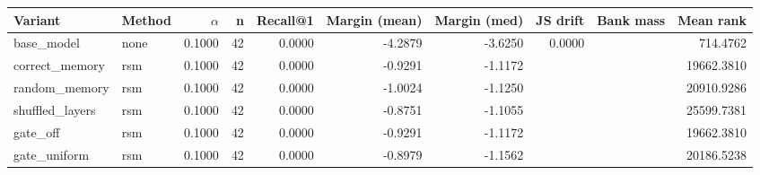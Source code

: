 \begin{tabular}{l l r r r r r r r r}
\toprule
Variant & Method & $\alpha$ & n & Recall@1 & Margin (mean) & Margin (med) & JS drift & Bank mass & Mean rank \\
\midrule
base\_model & none & 0.1000 & 42 & 0.0000 & -4.2879 & -3.6250 & 0.0000 &  & 714.4762 \\
correct\_memory & rsm & 0.1000 & 42 & 0.0000 & -0.9291 & -1.1172 &  &  & 19662.3810 \\
random\_memory & rsm & 0.1000 & 42 & 0.0000 & -1.0024 & -1.1250 &  &  & 20910.9286 \\
shuffled\_layers & rsm & 0.1000 & 42 & 0.0000 & -0.8751 & -1.1055 &  &  & 25599.7381 \\
gate\_off & rsm & 0.1000 & 42 & 0.0000 & -0.9291 & -1.1172 &  &  & 19662.3810 \\
gate\_uniform & rsm & 0.1000 & 42 & 0.0000 & -0.8979 & -1.1562 &  &  & 20186.5238 \\
\bottomrule
\end{tabular}
